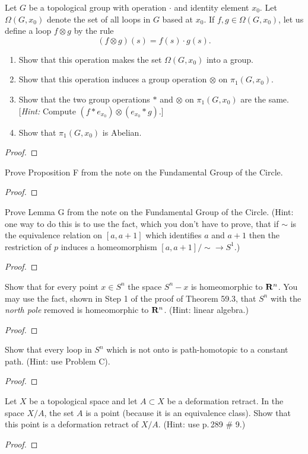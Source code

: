 \begin{problem}
Let $G$ be a topological group with operation $\cdot$ and identity element
$x_0$. Let $\Omega(G,x_0)$ denote the set of all loops in $G$ based at
$x_0$. If $f,g\in\Omega(G,x_0)$, let us define a loop $f\otimes g$ by the
rule
\[
(f\otimes g)(s)=f(s)\cdot g(s).
\]
\begin{enumerate}[label=(\alph*)]
\item Show that this operation makes the set $\Omega(G,x_0)$ into a group.
\item Show that this operation induces a group operation $\otimes$ on
  $\pi_1(G,x_0)$.
\item Show that the two group operations $*$ and $\otimes$ on
  $\pi_1(G,x_0)$ are the same. [\emph{Hint:} Compute
  $(f*e_{x_0})\otimes(e_{x_0}*g)$.]
\item Show that $\pi_1(G,x_0)$ is Abelian.
\end{enumerate}
\end{problem}
\begin{proof}
\end{proof}
\newpage
\begin{problem}[(A)]
Prove Proposition F from the note on the Fundamental Group of the
Circle.
\end{problem}
\begin{proof}
\end{proof}
\newpage
\begin{problem}[(B)]
Prove Lemma G from the note on the Fundamental Group of the Circle. (Hint:
one way to do this is to use the fact, which you don’t have to prove, that
if $\sim$ is the equivalence relation on $[a,a+1]$ which identifies $a$ and
$a+1$ then the restriction of $p$ induces a homeomorphism
$[a,a+1]/{\sim}\to S^1$.)
\end{problem}
\begin{proof}
\end{proof}
\newpage
\begin{problem}[(C)]
Show that for every point $x\in S^n$ the space $S^n-x$ is homeomorphic to
$\mathbf{R}^n$. You may use the fact, shown in Step 1 of the proof of Theorem
59.3, that $S^n$ with the \emph{north pole} removed is homeomorphic to
$\mathbf{R}^n$. (Hint: linear algebra.)
\end{problem}
\begin{proof}
\end{proof}
\newpage
\begin{problem}[(D)]
Show that every loop in $S^n$ which is not onto is path-homotopic to a
constant path. (Hint: use Problem C).
\end{problem}
\begin{proof}
\end{proof}
\newpage
\begin{problem}[(E)]
Let $X$ be a topological space and let $A\subset X$ be a deformation
retract. In the space $X/A$, the set $A$ is a point (because it is an
equivalence class). Show that this point is a deformation retract of
$X/A$. (Hint: use p.\,289 \# 9.)
\end{problem}
\begin{proof}
\end{proof}

